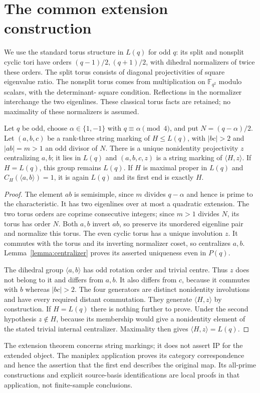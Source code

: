 \section{The common extension construction}
We use the standard torus structure in $L(q)$ for odd $q$: its split and
nonsplit cyclic tori have orders $(q-1)/2,(q+1)/2$, with dihedral
normalizers of twice these orders. The split torus consists of diagonal
projectivities of square eigenvalue ratio. The nonsplit torus comes from
multiplication on $\mathbb F_{q^2}$ modulo scalars, with the determinant-
square condition. Reflections in the normalizer interchange the two
eigenlines. These classical torus facts are retained; no maximality of
these normalizers is assumed.

\begin{theorem}\label{thm:extension}
Let $q$ be odd, choose $\alpha\in\{1,-1\}$ with $q\equiv\alpha\pmod4$,
and put $N=(q-\alpha)/2$. Let $(a,b,c)$ be a rank-three string marking
of $H\le L(q)$, with $|bc|>2$ and $|ab|=m>1$ an odd divisor of $N$.
There is a unique nonidentity projectivity $z$ centralizing $a,b$;
it lies in $L(q)$ and $(a,b,c,z)$ is a string marking of $\langle H,z\rangle$.
If $H=L(q)$, this group remains $L(q)$. If $H$ is maximal proper in
$L(q)$ and $C_H(\langle a,b\rangle)=1$, it is again $L(q)$ and its
first end is exactly $H$.
\end{theorem}
\begin{proof}
The element $ab$ is semisimple, since $m$ divides $q-\alpha$ and hence
is prime to the characteristic. It has two eigenlines over at most a
quadratic extension. The two torus orders are coprime consecutive integers;
since $m>1$ divides $N$, its torus has order $N$. Both $a,b$ invert
$ab$, so preserve its unordered eigenline pair and normalize this torus.
The even cyclic torus has a unique involution $z$. It commutes with the
torus and its inverting normalizer coset, so centralizes $a,b$.
Lemma~\ref{lemma:centralizer} proves its asserted uniqueness even in
$P(q)$.

The dihedral group $\langle a,b\rangle$ has odd rotation order and
trivial centre. Thus $z$ does not belong to it and differs from $a,b$.
It also differs from $c$, because it commutes with $b$ whereas $|bc|>2$.
The four generators are distinct nonidentity involutions and have every
required distant commutation. They generate $\langle H,z\rangle$ by
construction. If $H=L(q)$ there is nothing further to prove. Under the
second hypothesis $z\notin H$, because its membership would give a
nonidentity element of the stated trivial internal centralizer.
Maximality then gives $\langle H,z\rangle=L(q)$.
\end{proof}
The extension theorem concerns string markings; it does not assert IP
for the extended object. The maniplex application proves its category
correspondence and hence the assertion that the first end describes the
original map. Its all-prime constructions and explicit source-basis
identifications are local proofs in that application, not finite-sample
conclusions.

